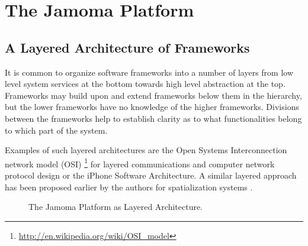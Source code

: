 \documentclass[twoside,10pt]{article}
\begin{document}





\section{The Jamoma Platform} %

\subsection{A Layered Architecture of Frameworks}


It is common to organize software frameworks into a number of layers from low level system services at the bottom towards high level abstraction at the top. Frameworks may build upon and extend frameworks below them in the hierarchy, but the lower frameworks have no knowledge of the higher frameworks.  Divisions between the frameworks help to establish clarity as to what functionalities belong to which part of the system. 

Examples of such layered architectures are the Open Systems Interconnection network model (OSI) \footnote{\url{http://en.wikipedia.org/wiki/OSI_model}} for layered communications and computer network protocol design or the iPhone Software Architecture. A similar layered approach has been proposed earlier by the authors for spatialization systems \cite{Peters:2009}. 


\begin{figure}[htbp]
\centerline{}
\caption{The Jamoma Platform as Layered Architecture.}
\label{fig:layers}
\end{figure}
\end{document}

